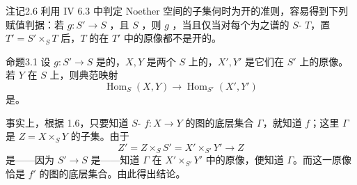 \begin{SGAresult}{注记}{2.6}
利用 IV 6.3 中判定 Noether 空间的子集何时为开的准则，容易得到下列赋值判据：若 $g:S'\to S$ ，且 $S$ ，则 $g$ ，当且仅当对每个为之谱的 $S$- $T$，置 $T'=S'\times_S T$ 后，$T$ 的在 $T'$ 中的原像都不是开的。
\end{SGAresult}

\begin{SGAresult}{命题}{3.1}
设 $g:S'\to S$ 是的，$X,Y$ 是两个 $S$ 上的，$X',Y'$ 是它们在 $S'$ 上的原像。若 $Y$ 在 $S$ 上，则典范映射
\[
\operatorname{Hom}_S(X,Y)\longrightarrow\operatorname{Hom}_{S'}(X',Y')
\]
是。
\end{SGAresult}
事实上，根据 1.6，只要知道 $S$- $f:X\to Y$ 的图的底层集合 $\Gamma$，就知道 $f$；这里 $\Gamma$ 是 $Z=X\times_S Y$ 的子集。由于
\[
Z'=Z\times_S S'=X'\times_{S'}Y'\longrightarrow Z
\]
是——因为 $S'\to S$ 是——知道 $\Gamma$ 在 $X'\times_{S'}Y'$ 中的原像，便知道 $\Gamma$。而这一原像恰是 $f'$ 的图的底层集合。由此得出结论。

